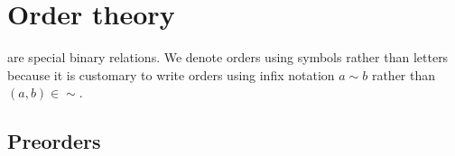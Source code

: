 \section{Order theory}\label{sec:order_theory}

\begin{remark}\label{remark:order_infix_notation}
   are special binary relations. We denote orders using symbols rather than letters because it is customary to write orders using infix notation \( a \sim b \) rather than \( (a, b) \in \sim \).
\end{remark}

\subsection{Preorders}\label{subsec:preorders}

